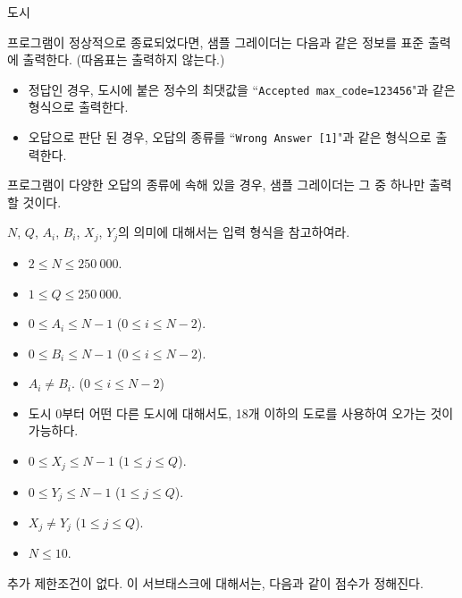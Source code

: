 \begin{problem}{도시}
	
	\OutputFile
	
	프로그램이 정상적으로 종료되었다면, 샘플 그레이더는 다음과 같은 정보를 표준 출력에 출력한다. (따옴표는 출력하지 않는다.)
	
	\begin{itemize}
		\item 정답인 경우, 도시에 붙은 정수의 최댓값을 ``\texttt{Accepted max\_code=123456}"과 같은 형식으로 출력한다. 
		\item 오답으로 판단 된 경우, 오답의 종류를 ``\texttt{Wrong Answer [1]}"과 같은 형식으로 출력한다.
	\end{itemize}
	
	프로그램이 다양한 오답의 종류에 속해 있을 경우, 샘플 그레이더는 그 중 하나만 출력 할 것이다.
	
	\Constraints
	
	$N$, $Q$, $A_i$, $B_i$, $X_j$, $Y_j$의 의미에 대해서는 입력 형식을 참고하여라.
	
	\begin{itemize}
		\item $2 \le N \le 250\ 000$.
		\item $1 \le Q \le 250\ 000$.
		\item $0 \le A_i \le N-1$ ($0 \le i \le N-2$).
		\item $0 \le B_i \le N-1$ ($0 \le i \le N-2$).
		\item $A_i \ne B_i$. ($0 \le i \le N-2$)
		\item 도시 0부터 어떤 다른 도시에 대해서도, 18개 이하의 도로를 사용하여 오가는 것이 가능하다.
		\item $0 \le X_j \le N-1$ ($1 \le j \le Q$).
		\item $0 \le Y_j \le N-1$ ($1 \le j \le Q$).
		\item $X_j \ne Y_j$ ($1 \le j \le Q$).
	\end{itemize}
	
	
	\begin{itemize}
		\item $N \le 10$.
	\end{itemize}
	
	
	
	추가 제한조건이 없다. 이 서브태스크에 대해서는, 다음과 같이 점수가 정해진다.
	

\end{problem}
